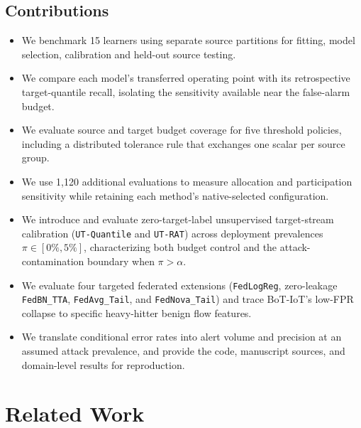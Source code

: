 \documentclass[journal,10pt]{IEEEtran}
\begin{document}
\subsection*{Contributions}
\begin{itemize}
\item We benchmark 15 learners using separate source partitions for fitting, model selection, calibration and held-out source testing.
\item We compare each model's transferred operating point with its retrospective target-quantile recall, isolating the sensitivity available near the false-alarm budget.
\item We evaluate source and target budget coverage for five threshold policies, including a distributed tolerance rule that exchanges one scalar per source group.
\item We use 1,120 additional evaluations to measure allocation and participation sensitivity while retaining each method's native-selected configuration.
\item We introduce and evaluate zero-target-label unsupervised target-stream calibration (\texttt{UT-Quantile} and \texttt{UT-RAT}) across deployment prevalences $\pi\in[0\%,5\%]$, characterizing both budget control and the attack-contamination boundary when $\pi>\alpha$.
\item We evaluate four targeted federated extensions (\texttt{FedLogReg}, zero-leakage \texttt{FedBN\_TTA}, \texttt{FedAvg\_Tail}, and \texttt{FedNova\_Tail}) and trace BoT-IoT's low-FPR collapse to specific heavy-hitter benign flow features.
\item We translate conditional error rates into alert volume and precision at an assumed attack prevalence, and provide the code, manuscript sources, and domain-level results for reproduction.
\end{itemize}

\section{Related Work}
\end{document}
